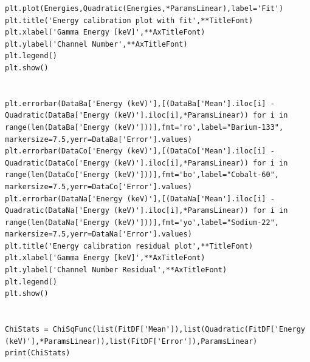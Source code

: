 \documentclass[11pt,a4paper]{article}
\begin{document}
\begin{verbatim}
plt.plot(Energies,Quadratic(Energies,*ParamsLinear),label='Fit')
plt.title('Energy calibration plot with fit',**TitleFont)
plt.xlabel('Gamma Energy [keV]',**AxTitleFont)
plt.ylabel('Channel Number',**AxTitleFont)
plt.legend()
plt.show()


plt.errorbar(DataBa['Energy (keV)'],[(DataBa['Mean'].iloc[i] - Quadratic(DataBa['Energy (keV)'].iloc[i],*ParamsLinear)) for i in range(len(DataBa['Energy (keV)']))],fmt='ro',label="Barium-133", markersize=7.5,yerr=DataBa['Error'].values)
plt.errorbar(DataCo['Energy (keV)'],[(DataCo['Mean'].iloc[i] - Quadratic(DataCo['Energy (keV)'].iloc[i],*ParamsLinear)) for i in range(len(DataCo['Energy (keV)']))],fmt='bo',label="Cobalt-60", markersize=7.5,yerr=DataCo['Error'].values)
plt.errorbar(DataNa['Energy (keV)'],[(DataNa['Mean'].iloc[i] - Quadratic(DataNa['Energy (keV)'].iloc[i],*ParamsLinear)) for i in range(len(DataNa['Energy (keV)']))],fmt='yo',label="Sodium-22", markersize=7.5,yerr=DataNa['Error'].values)
plt.title('Energy calibration residual plot',**TitleFont)
plt.xlabel('Gamma Energy [keV]',**AxTitleFont)
plt.ylabel('Channel Number Residual',**AxTitleFont)
plt.legend()
plt.show()


ChiStats = ChiSqFunc(list(FitDF['Mean']),list(Quadratic(FitDF['Energy (keV)'],*ParamsLinear)),list(FitDF['Error']),ParamsLinear)
print(ChiStats)
\end{verbatim}
\clearpage
\end{document}
